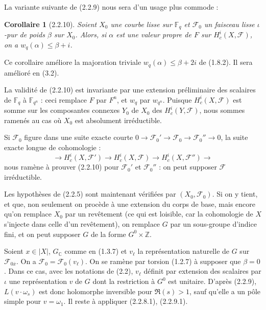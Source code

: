 \documentclass[12pt,a4paper]{article}
\theoremstyle{plain}
\newtheorem{corollary}[theorem]{Corollaire}
\theoremstyle{definition}
\theoremstyle{remark}
\newcommand{\CC}{{\mathbb{C}}}
\newcommand{\FF}{{\mathbb{F}}}
\newcommand{\ZZ}{{\mathbb{Z}}}
\begin{document}
La variante suivante de (2.2.9) nous sera d'un usage plus commode :

\begin{corollary}[2.2.10]
Soient $X_0$ une courbe lisse sur $\FF_q$ et $\mathscr{F}_0$ un faisceau lisse $\iota$-pur de poids $\beta$ sur $X_0$. Alors, si $\alpha$ est une valeur propre de $F$ sur $H_c^i(X, \mathscr{F})$, on a $w_q(\alpha) \leq \beta + i$.
\end{corollary}

Ce corollaire am\'eliore la majoration triviale $w_q(\alpha) \leq \beta + 2i$ de (1.8.2). Il sera am\'elior\'e en (3.2).

La validit\'e de (2.2.10) est invariante par une extension pr\'eliminaire des scalaires de $\FF_q$ \`a $\FF_{q^n}$ : ceci remplace $F$ par $F^n$, et $w_q$ par $w_{q^n}$. Puisque $H_c^i(X, \mathscr{F})$ est somme sur les composantes connexes $Y_0$ de $X_0$ des $H_c^i(Y, \mathscr{F})$, nous sommes ramen\'es au cas o\`u $X_0$ est absolument irr\'eductible.

Si $\mathscr{F}_0$ figure dans une suite exacte courte $0 \to \mathscr{F}_0' \to \mathscr{F}_0 \to \mathscr{F}_0'' \to 0$, la suite exacte longue de cohomologie :
\[ \to H_c^i(X, \mathscr{F}') \to H_c^i(X, \mathscr{F}) \to H_c^i(X, \mathscr{F}'') \to \]
nous ram\`ene \`a prouver (2.2.10) pour $\mathscr{F}_0'$ et $\mathscr{F}_0''$ : on peut supposer $\mathscr{F}$ irr\'eductible.

Les hypoth\`eses de (2.2.5) sont maintenant v\'erifi\'ees par $(X_0, \mathscr{F}_0)$. Si on y tient, et que, non seulement on proc\`ede \`a une extension du corps de base, mais encore qu'on remplace $X_0$ par un rev\^etement (ce qui est loisible, car la cohomologie de $X$ s'injecte dans celle d'un rev\^etement), on remplace $G$ par un sous-groupe d'indice fini, et on peut supposer $G$ de la forme $G^0 \times \ZZ$.

Soient $x \in |X|$, $G_\CC$ comme en (1.3.7) et $v_\ell$ la repr\'esentation naturelle de $G$ sur $\mathscr{F}_{0\overline{x}}$. On a $\mathscr{F}_0 = \mathscr{F}_0(v_\ell)$. On se ram\`ene par torsion (1.2.7) \`a supposer que $\beta = 0$. Dans ce cas, avec les notations de (2.2), $v_\ell$ d\'efinit par extension des scalaires par $\iota$ une repr\'esentation $v$ de $G$ dont la restriction \`a $G^0$ est unitaire. D'apr\`es (2.2.9), $L(v \cdot \omega_s)$ est donc holomorphe inversible pour $\Re(s) > 1$, sauf qu'elle a un p\^ole simple pour $v = \omega_1$. Il reste \`a appliquer (2.2.8.1), (2.2.9.1).


\newpage
\end{document}

